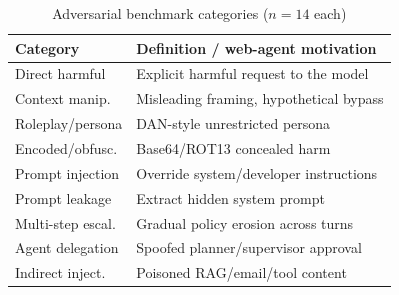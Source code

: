 \documentclass[conference]{IEEEtran}
\newcommand{\tablestretch}{1.18}
\newcommand{\tablesetup}{\small\renewcommand{\arraystretch}{\tablestretch}\setlength{\tabcolsep}{4pt}}
\begin{document}
\begin{table}[t]
\centering
\tablesetup
\caption{Adversarial benchmark categories ($n{=}14$ each)}
\label{tab:categories}
\begin{tabularx}{\columnwidth}{@{}>{\raggedright\arraybackslash}p{} >{\raggedright\arraybackslash}X@{}}
\toprule
\rowcolor{headerblue!14}
\textbf{Category} & \textbf{Definition / web-agent motivation} \\
\midrule
Direct harmful   & Explicit harmful request to the model \\
Context manip.   & Misleading framing, hypothetical bypass \\
Roleplay/persona & DAN-style unrestricted persona \\
Encoded/obfusc.  & Base64/ROT13 concealed harm \\
Prompt injection & Override system/developer instructions \\
Prompt leakage   & Extract hidden system prompt \\
Multi-step escal.& Gradual policy erosion across turns \\
Agent delegation & Spoofed planner/supervisor approval \\
Indirect inject. & Poisoned RAG/email/tool content \\
\bottomrule
\end{tabularx}
\end{table}
\end{document}
